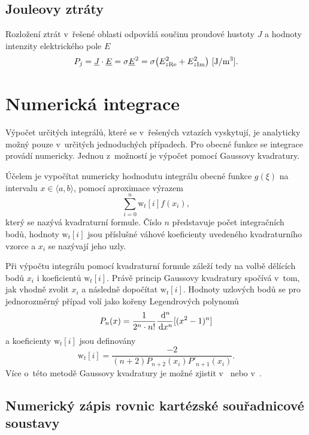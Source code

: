 \subsection*{Jouleovy ztráty}
Rozložení ztrát v~řešené oblasti odpovídá součinu proudové hustoty $J$ a hodnoty intenzity elektrického pole $E$ 
\begin{displaymath}
	P_j = {\underline{J}} \cdot {\underline{E}} = \sigma {\underline{E}}^{2} = \sigma \big(E_{z\mathrm{Re}}^{2} + E_{z\mathrm{Im}}^{2}\big)\mathrm{\ [J/m^{3}]}.
\end{displaymath}

\section{Numerická integrace}
Výpočet určitých integrálů, které se v~řešených vztazích vyskytují, je analyticky možný pouze v~určitých jednoduchých případech. Pro obecné funkce se integrace provádí numericky. Jednou z~možností je výpočet pomocí Gaussovy kvadratury.

Účelem je vypočítat numericky hodnodutu integrálu obecné funkce $g(\xi)$ na intervalu $x\in\langle a, b\rangle$,  pomocí aproximace výrazem
\begin{displaymath}
\sum_{i=0}^{n}\mathrm{w}_{t}[i]f(x_{i}),
\end{displaymath}
který se nazývá kvadraturní formule. Číslo $n$ představuje počet integračních bodů, hodnoty $\mathrm{w}_{t}[i]$ jsou příslušné váhové koeficienty uvedeného kvadraturního vzorce a $x_{i}$ se nazývají jeho uzly. 

Při výpočtu integrálu pomocí kvadraturní formule záleží tedy na volbě dělících bodů $x_{i}$ i koeficientů $\mathrm{w}_{t}[i]$. Právě princip Gaussovy kvadratury spočívá v~tom, jak vhodně zvolit $x_{i}$ a následně dopočítat $\mathrm{w}_{t}[i]$. Hodnoty uzlových bodů se pro jednorozměrný případ volí jako kořeny Legendrových polynomů
\begin{displaymath}
	P_{n}(x) = \frac{1}{2^{n}\cdot n!}\frac{\,\mathrm{d}^{n}}{\,\mathrm{d} x^{n}}[(x^{2} - 1)^{n}]
\end{displaymath}
a koeficienty $\mathrm{w}_{t}[i]$ jsou definovány
\begin{displaymath}
\mathrm{w}_{t}[i] = \frac{-2}{(n+2)P_{n+2}(x_i)P'_{n+1}(x_i)}.
\end{displaymath}
Více o~této metodě Gaussovy kvadratury je možné zjistit v~\cite{gk_tichy} nebo v~\cite{gk_kaw}.

\subsection{Numerický zápis rovnic kartézské souřadnicové soustavy}
